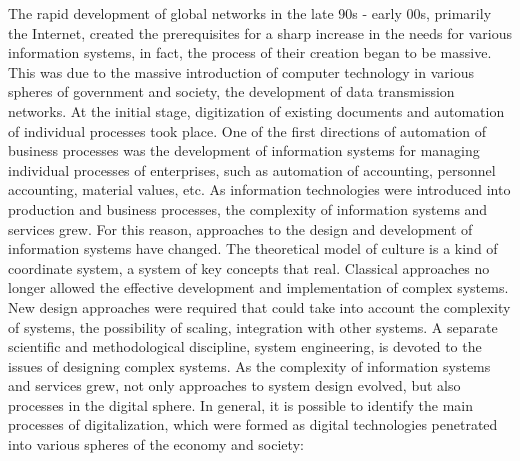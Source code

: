 \documentclass{article}
\begin{document}
\begin{multicols}{2}
The rapid development of global networks in the
late 90s - early 00s, primarily the Internet, created the
prerequisites for a sharp increase in the needs for various
information systems, in fact, the process of their creation
began to be massive. This was due to the massive introduction of computer technology in various spheres of
government and society, the development of data transmission networks. At the initial stage, digitization of existing documents and automation of individual processes
took place. One of the first directions of automation of
business processes was the development of information
systems for managing individual processes of enterprises,
such as automation of accounting, personnel accounting,
material values, etc. As information technologies were
introduced into production and business processes, the
complexity of information systems and services grew.
For this reason, approaches to the design and development of information systems have changed. The theoretical model of culture is a kind of coordinate
system, a system of key concepts that real. Classical
approaches no longer allowed the effective development
and implementation of complex systems. New design
approaches were required that could take into account
the complexity of systems, the possibility of scaling,
integration with other systems. A separate scientific
and methodological discipline, system engineering, is
devoted to the issues of designing complex systems. As
the complexity of information systems and services grew,
not only approaches to system design evolved, but also
processes in the digital sphere. In general, it is possible to
identify the main processes of digitalization, which were
formed as digital technologies penetrated into various
spheres of the economy and society:
\vspace{10pt}


\end{multicols}
\end{document}

